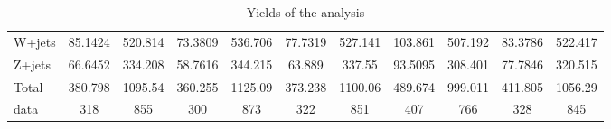 \documentclass[10pt]{article}
\begin{document}
\begin{table}[htbp]
\begin{center}
\begin{tabular}{|l|S|S|S|S|S|S|S|S|S|S|}
  W+jets   & 85.1424  & 520.814  & 73.3809  & 536.706  & 77.7319  & 527.141  & 103.861  & 507.192  & 83.3786  & 522.417  \\ 
  Z+jets   & 66.6452  & 334.208  & 58.7616  & 344.215  & 63.889  & 337.55  & 93.5095  & 308.401  & 77.7846  & 320.515  \\ 
\hline 
  Total  & 380.798  & 1095.54  & 360.255  & 1125.09  & 373.238  & 1100.06  & 489.674  & 999.011  & 411.805  & 1056.29  \\ 
\hline 
  data   & 318 & 855 & 300 & 873 & 322 & 851 & 407 & 766 & 328 & 845 \\ 
\hline 
\end{tabular} 
\caption{Yields of the analysis} 
\end{center} 
\end{table} 
\end{document}
